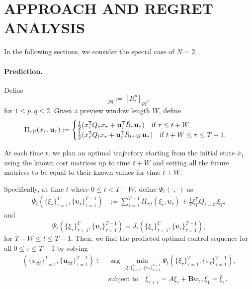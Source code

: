 \documentclass[letterpaper, 10 pt, conference]{ieeeconf}  %
\newcommand{\transpose}{\mathsf{T}}
\begin{document}
\section{APPROACH AND REGRET ANALYSIS}
In the following sections, we consider the special case of $N = 2$. 
\paragraph{Prediction. } 
Define
\begin{equation}
    [\bar{R}_{t}]_{pq} := [R_{t}^{p}]_{pq},
\end{equation}
for $1 \leq p,q \leq 2$. Given a preview window length $W$, define
\begin{equation}
\begin{split}
    \Pi_{\tau|t}(x_{\tau},\mathbf{u}_{\tau}) := 
    \begin{cases}
        \frac{1}{2} (x_{\tau}^{\transpose}Q_{\tau}x_{\tau} +  \mathbf{u}_{\tau}^{\transpose}\bar{R}_{\tau}\mathbf{u}_{\tau}) \text{\quad if $\tau \leq t+W$}\\
        \frac{1}{2} (x_{\tau}^{\transpose}Q_{t}x_{\tau} + \mathbf{u}_{\tau}^{\transpose}\bar{R}_{t+W}\mathbf{u}_{\tau}) \text{\quad if $t+W \leq \tau \leq T-1$}.
    \end{cases}
\end{split}
\end{equation}

At each time $t$, we plan an optimal trajectory starting from the initial state $\bar{x}_{1}$ using the known cost matrices up to time $t+W$ and setting all the future matrices to be equal to their known values for time $t+W$.

Specifically, at time $t$ where $0\leq t < T-W$, define $\Psi_{t}(\cdot,\cdot)$ as
\begin{align}
\Psi_{t}(\{\xi_{\tau}\}_{\tau=1}^{T},\{\boldsymbol{\upsilon}_{\tau}\}_{\tau=1}^{T-1}) &:= \sum_{\tau=1}^{T-1} \Pi_{\tau|t}(\xi_{\tau},\boldsymbol{\upsilon}_{\tau}) + \frac{1}{2} \xi_{T}^{\transpose}Q_{t+W}\xi_{T},
\end{align}
and 
\begin{equation}
    \Psi_{t}(\{\xi_{\tau}\}_{\tau=1}^{T},\{\boldsymbol{\upsilon}_{\tau}\}_{\tau=1}^{T-1}) = J_{t}(\{\xi_{\tau}\}_{\tau=1}^{T},\{\boldsymbol{\upsilon}_{\tau}\}_{\tau=1}^{T-1}),
\end{equation}
for $T-W \leq t \leq T-1$.
Then, we find the predicted optimal control sequence for all $0\leq \tau\leq T-1$ by solving
\begin{equation}
\begin{split}
    (\{x_{\tau|t}\}_{\tau=1}^{T}, \{\mathbf{u}_{\tau|t}\}_{\tau=1}^{T-1}) \in &\arg\min_{\{\xi_{\tau}\}_{\tau=1}^{T},\{\upsilon_{\tau}\}_{\tau=1}^{T-1}} \Psi_{t}(\{\xi_{\tau}\}_{\tau=1}^{T},\{\upsilon_{\tau}\}_{\tau=1}^{T-1}),\\
    &\text{subject to}\quad \xi_{\tau+1} = A\xi_{\tau} + \mathbf{B}\mathbf{\upsilon_{\tau}}, \xi_{1} = \bar{\xi}_{1}.
\end{split}
\end{equation}
\end{document}
